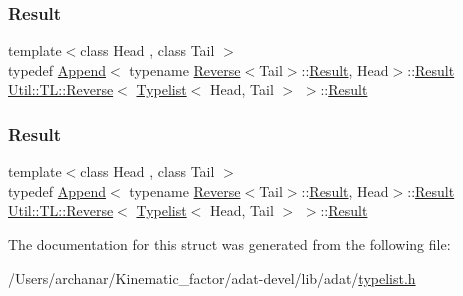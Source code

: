 \subsubsection{\texorpdfstring{Result}{Result}\hspace{0.1cm}{\footnotesize\ttfamily [2/3]}}
{\footnotesize\ttfamily template$<$class Head , class Tail $>$ \\
typedef \mbox{\hyperlink{structUtil_1_1TL_1_1Append}{Append}}$<$ typename \mbox{\hyperlink{structUtil_1_1TL_1_1Reverse}{Reverse}}$<$Tail$>$\+::\mbox{\hyperlink{structUtil_1_1TL_1_1Reverse_3_01Typelist_3_01Head_00_01Tail_01_4_01_4_a9886893d82dd4c1124f42d7d45fdbdbd}{Result}}, Head$>$\+::\mbox{\hyperlink{structUtil_1_1TL_1_1Reverse_3_01Typelist_3_01Head_00_01Tail_01_4_01_4_a9886893d82dd4c1124f42d7d45fdbdbd}{Result}} \mbox{\hyperlink{structUtil_1_1TL_1_1Reverse}{Util\+::\+T\+L\+::\+Reverse}}$<$ \mbox{\hyperlink{structUtil_1_1Typelist}{Typelist}}$<$ Head, Tail $>$ $>$\+::\mbox{\hyperlink{structUtil_1_1TL_1_1Reverse_3_01Typelist_3_01Head_00_01Tail_01_4_01_4_a9886893d82dd4c1124f42d7d45fdbdbd}{Result}}}

\mbox{\label{structUtil_1_1TL_1_1Reverse_3_01Typelist_3_01Head_00_01Tail_01_4_01_4_a9886893d82dd4c1124f42d7d45fdbdbd}} 
\subsubsection{\texorpdfstring{Result}{Result}\hspace{0.1cm}{\footnotesize\ttfamily [3/3]}}
{\footnotesize\ttfamily template$<$class Head , class Tail $>$ \\
typedef \mbox{\hyperlink{structUtil_1_1TL_1_1Append}{Append}}$<$ typename \mbox{\hyperlink{structUtil_1_1TL_1_1Reverse}{Reverse}}$<$Tail$>$\+::\mbox{\hyperlink{structUtil_1_1TL_1_1Reverse_3_01Typelist_3_01Head_00_01Tail_01_4_01_4_a9886893d82dd4c1124f42d7d45fdbdbd}{Result}}, Head$>$\+::\mbox{\hyperlink{structUtil_1_1TL_1_1Reverse_3_01Typelist_3_01Head_00_01Tail_01_4_01_4_a9886893d82dd4c1124f42d7d45fdbdbd}{Result}} \mbox{\hyperlink{structUtil_1_1TL_1_1Reverse}{Util\+::\+T\+L\+::\+Reverse}}$<$ \mbox{\hyperlink{structUtil_1_1Typelist}{Typelist}}$<$ Head, Tail $>$ $>$\+::\mbox{\hyperlink{structUtil_1_1TL_1_1Reverse_3_01Typelist_3_01Head_00_01Tail_01_4_01_4_a9886893d82dd4c1124f42d7d45fdbdbd}{Result}}}



The documentation for this struct was generated from the following file\+:\begin{DoxyCompactItemize}
\item 
/\+Users/archanar/\+Kinematic\+\_\+factor/adat-\/devel/lib/adat/\mbox{\hyperlink{adat-devel_2lib_2adat_2typelist_8h}{typelist.\+h}}\end{DoxyCompactItemize}
